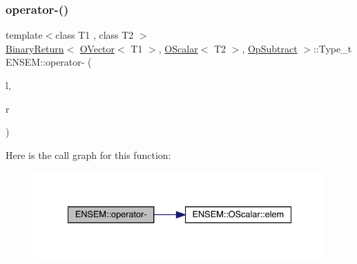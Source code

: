 \subsubsection{\texorpdfstring{operator-\/()}{operator-()}\hspace{0.1cm}{\footnotesize\ttfamily [3/4]}}
{\footnotesize\ttfamily template$<$class T1 , class T2 $>$ \\
\mbox{\hyperlink{structENSEM_1_1BinaryReturn}{Binary\+Return}}$<$ \mbox{\hyperlink{classENSEM_1_1OVector}{O\+Vector}}$<$ T1 $>$, \mbox{\hyperlink{classENSEM_1_1OScalar}{O\+Scalar}}$<$ T2 $>$, \mbox{\hyperlink{structENSEM_1_1OpSubtract}{Op\+Subtract}} $>$\+::Type\+\_\+t E\+N\+S\+E\+M\+::operator-\/ (\begin{DoxyParamCaption}\item[{const \mbox{\hyperlink{classENSEM_1_1OVector}{O\+Vector}}$<$ T1 $>$ \&}]{l,  }\item[{const \mbox{\hyperlink{classENSEM_1_1OScalar}{O\+Scalar}}$<$ T2 $>$ \&}]{r }\end{DoxyParamCaption})\hspace{0.3cm}{\ttfamily [inline]}}

Here is the call graph for this function\+:\nopagebreak
\begin{figure}[H]
\begin{center}
\leavevmode
\includegraphics[width=334pt]{da/d59/group__obsvector_ga99ab390926e54bd5fb8ad9265047f9cb_cgraph}
\end{center}
\end{figure}
\mbox{\label{group__obsvector_gaa851105d0e0292f6a8503c61aafb6bb8}} 
